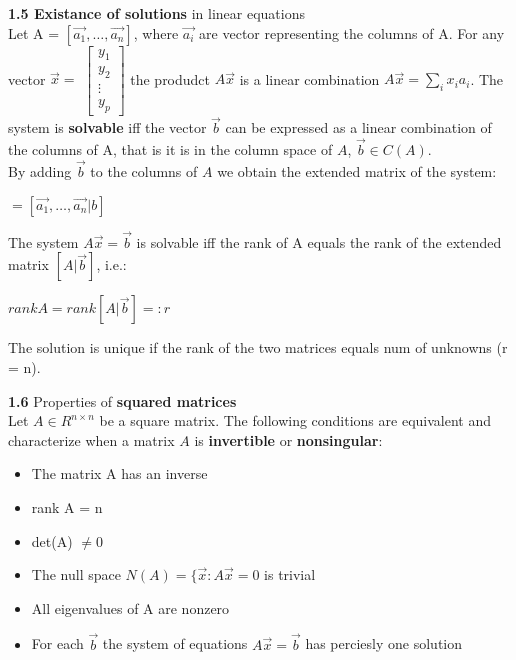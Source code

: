 \documentclass{article}
\begin{document}
\begin{multicols}{2}
\textbf{1.5 Existance of solutions} in linear equations\\
Let A = $[\vec{a_1}, \dots, \vec{a_n} ]$, where $\vec{a_i}$ are vector representing
the columns of A.
For any vector $\vec{x} =$ \begin{math}
                             \begin{bmatrix}
                                  y_1 \\
                                  y_2 \\
                                  \vdots \\
                                  y_p
                             \end{bmatrix}
                           \end{math}
the produdct $A\vec{x}$ is 
a linear combination $A\vec{x} = \sum_i x_i a_i$. The system is \textbf{solvable} iff the
vector $\vec{b}$ can be expressed as a linear combination of the columns of A, that is
it is in the column space of $A$, $\vec{b} \in C(A)$.\\
By adding $\vec{b}$ to the columns of $A$ we obtain the extended matrix of the system:
\begin{center}
    \begin{math}
        [A| \vec{b}] = [\vec{a_1}, \dots, \vec{a_n} | b]
    \end{math}
\end{center}
The system $A\vec{x} = \vec{b}$ is solvable iff the rank of A equals the rank of the
extended matrix $[A| \vec{b}]$, i.e.:
\begin{center}
    \begin{math}
        rank A = rank [A| \vec{b}] =: r
    \end{math}
\end{center}
The solution is unique if the rank of the two matrices equals num of unknowns (r = n).

\textbf{1.6} Properties of \textbf{squared matrices}\\
Let $A \in R^{n \times n}$ be a square matrix. The following conditions are equivalent
and characterize when a matrix $A$ is \textbf{invertible} or \textbf{nonsingular}:
\begin{itemize}
    \setlength\itemsep{0.1em}
    \item The matrix A has an inverse
    \item rank A = n
    \item det(A) $\neq 0$
    \item The null space $N(A) = \{\vec{x}: A\vec{x} = 0$ is trivial
    \item All eigenvalues of A are nonzero
    \item For each $\vec{b}$ the system of equations $A \vec{x} = \vec{b}$ has perciesly one solution
\end{itemize}


\end{multicols}
\end{document}
